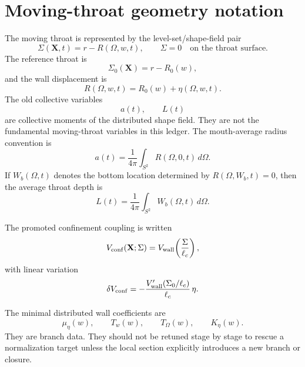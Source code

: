 \section{Moving-throat geometry notation}
\label{sec:geometry-notation}

The moving throat is represented by the level-set/shape-field pair
\begin{equation}
  \Sigma(\mathbf X,t)=r-R(\Omega,w,t),
  \qquad
  \Sigma=0 \quad \text{on the throat surface}.
\end{equation}
The reference throat is
\begin{equation}
  \Sigma_0(\mathbf X)=r-R_0(w),
\end{equation}
and the wall displacement is
\begin{equation}
  R(\Omega,w,t)=R_0(w)+\eta(\Omega,w,t).
\end{equation}
The old collective variables
\begin{equation}
  a(t),
  \qquad
  L(t)
\end{equation}
are collective moments of the distributed shape field.  They are not the fundamental moving-throat variables in this ledger.  The mouth-average radius convention is
\begin{equation}
  a(t)=\frac{1}{4\pi}\int_{S^2}R(\Omega,0,t)\,d\Omega.
\end{equation}
If \(W_b(\Omega,t)\) denotes the bottom location determined by \(R(\Omega,W_b,t)=0\), then the average throat depth is
\begin{equation}
  L(t)=\frac{1}{4\pi}\int_{S^2}W_b(\Omega,t)\,d\Omega.
\end{equation}

The promoted confinement coupling is written
\begin{equation}
  V_{\rm conf}(\mathbf X;\Sigma)=V_{\rm wall}\!\left(\frac{\Sigma}{\ell_c}\right),
\end{equation}
with linear variation
\begin{equation}
  \delta V_{\rm conf}
  =
  -\frac{V_{\rm wall}'(\Sigma_0/\ell_c)}{\ell_c}\,\eta.
\end{equation}

The minimal distributed wall coefficients are
\begin{equation}
  \mu_\eta(w),
  \qquad
  T_w(w),
  \qquad
  T_\Omega(w),
  \qquad
  K_\eta(w).
\end{equation}
They are branch data.  They should not be retuned stage by stage to rescue a normalization target unless the local section explicitly introduces a new branch or closure.

